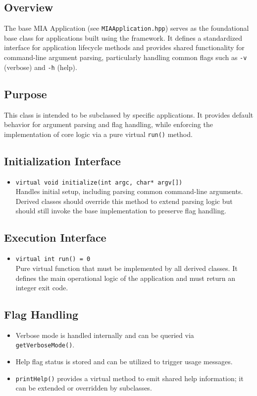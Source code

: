 \subsection*{Overview}
The base MIA Application (see \texttt{MIAApplication.hpp}) serves as the foundational base class for applications built using the framework. It defines a standardized interface for application lifecycle methods and provides shared functionality for command-line argument parsing, particularly handling common flags such as \texttt{-v} (verbose) and \texttt{-h} (help).

\subsection*{Purpose}
This class is intended to be subclassed by specific applications. It provides default behavior for argument parsing and flag handling, while enforcing the implementation of core logic via a pure virtual \texttt{run()} method.

\subsection*{Initialization Interface}
\begin{itemize}
	\item \texttt{virtual void initialize(int argc, char* argv[])} \\
	Handles initial setup, including parsing common command-line arguments. 
	Derived classes should override this method to extend parsing logic but should still invoke the base implementation to preserve flag handling.
\end{itemize}

\subsection*{Execution Interface}
\begin{itemize}
	\item \texttt{virtual int run() = 0} \\
	Pure virtual function that must be implemented by all derived classes. It defines the main operational logic of the application and must return an integer exit code.
\end{itemize}

\subsection*{Flag Handling}
\begin{itemize}
	\item Verbose mode is handled internally and can be queried via \texttt{getVerboseMode()}.
	\item Help flag status is stored and can be utilized to trigger usage messages.
	\item \texttt{printHelp()} provides a virtual method to emit shared help information; it can be extended or overridden by subclasses.
\end{itemize}

